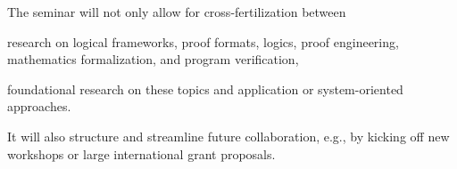 The seminar will not only allow for cross-fertilization between
 \begin{compactitem}
  \item research on logical frameworks, proof formats, logics, proof engineering, mathematics formalization, and program verification,
  \item foundational research on these topics and application or system-oriented approaches.
 \end{compactitem}
It will also structure and streamline future collaboration, e.g., by kicking off new workshops or large international grant proposals.


